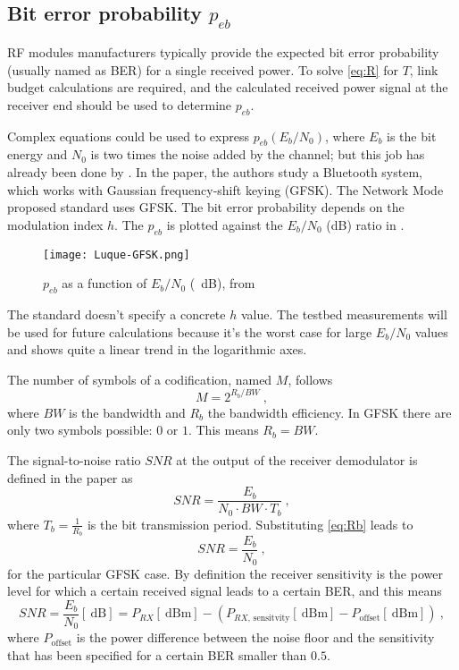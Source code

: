 \subsection{Bit error probability $p_{eb}$}
RF modules manufacturers typically provide the expected bit error probability (usually named as BER) for a single received power. To solve \eqref{eq:R} for $T$, link budget calculations are required, and the calculated received power signal at the receiver end should be used to determine $p_{eb}$.

Complex equations could be used to express $p_{eb} \left( E_b/N_0 \right)$, where $E_b$ is the bit energy and $N_0$ is two times the noise added by the channel; but this job has already been done by \textcite{Luque2012}. In the paper, the authors study a Bluetooth system, which works with Gaussian frequency-shift keying (GFSK). The Network Mode proposed standard uses GFSK. The bit error probability depends on the modulation index $h$. The $p_{eb}$ is plotted against the $E_b/N_0$ (dB) ratio in .
\begin{figure}[H] \centering
	\texttt{[image: Luque-GFSK.png]}
	\caption{$p_{eb}$ as a function of $E_b/N_0$ (\SI{}{\dB}), from \textcite{Luque2012}}
	\label{fig:Luque-GFSK-png}
\end{figure}
The standard doesn't specify a concrete $h$ value. The testbed measurements will be used for future calculations because it's the worst case for large $E_b / N_0$ values and shows quite a linear trend in the logarithmic axes.

The number of symbols of a codification, named $M$, follows
\begin{equation}
	M = 2^{R_b/BW} \ ,
	\label{eq:Rb}
\end{equation}
where $BW$ is the bandwidth and $R_b$ the bandwidth efficiency. In GFSK there are only two symbols possible: $0$ or $1$. This means $R_b = BW$. 

The signal-to-noise ratio $SNR$ at the output of the receiver demodulator is defined in the paper as
\begin{equation}
	SNR = \frac{E_b}{N_0 \cdot BW \cdot T_b} \ ,
\end{equation}
where $T_b = \frac{1}{R_b}$ is the bit transmission period. Substituting \eqref{eq:Rb} leads to
\begin{equation}
	SNR = \frac{E_b}{N_0} \ ,
\end{equation}
for the particular GFSK case. By definition the receiver sensitivity is the power level for which a certain received signal leads to a certain BER, and this means
\begin{equation}
	SNR = \frac{E_b}{N_0} \left[ \SI{}{\dB} \right]  = P_{RX} \left[ \SI{}{\dB}\text{m} \right]   - \left( P_{RX\text{, sensitvity}} \left[ \SI{}{\dB}\text{m} \right] - P_{\text{offset}} \left[ \SI{}{\dB}\text{m} \right] \right)   \ ,
\end{equation}
% 
where $P_{\text{offset}}$ is the power difference between the noise floor and the sensitivity that has been specified for a certain BER smaller than $0.5$.


